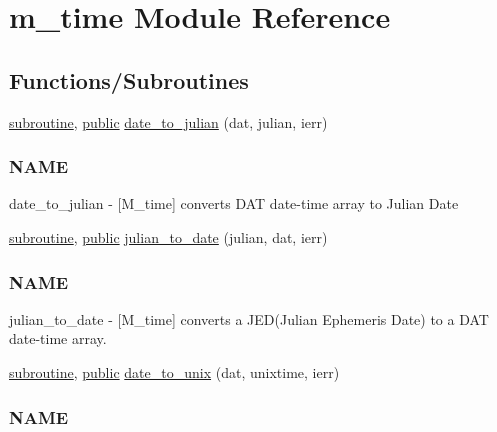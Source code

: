 \hypertarget{namespacem__time}{}\section{m\+\_\+time Module Reference}
\label{namespacem__time}
\subsection*{Functions/\+Subroutines}
\begin{DoxyCompactItemize}
\item 
\hyperlink{M__stopwatch_83_8txt_acfbcff50169d691ff02d4a123ed70482}{subroutine}, \hyperlink{M__stopwatch_83_8txt_a2f74811300c361e53b430611a7d1769f}{public} \hyperlink{namespacem__time_acfdc970b4154b0c15bd33727636e3992}{date\+\_\+to\+\_\+julian} (dat, julian, ierr)
\begin{DoxyCompactList}\small\item\em \subsubsection*{N\+A\+ME}

date\+\_\+to\+\_\+julian -\/ \mbox{[}M\+\_\+time\mbox{]} converts D\+AT date-\/time array to Julian Date \end{DoxyCompactList}\item 
\hyperlink{M__stopwatch_83_8txt_acfbcff50169d691ff02d4a123ed70482}{subroutine}, \hyperlink{M__stopwatch_83_8txt_a2f74811300c361e53b430611a7d1769f}{public} \hyperlink{namespacem__time_abb44cf18cd0a3e420c20469efb056203}{julian\+\_\+to\+\_\+date} (julian, dat, ierr)
\begin{DoxyCompactList}\small\item\em \subsubsection*{N\+A\+ME}

julian\+\_\+to\+\_\+date -\/ \mbox{[}M\+\_\+time\mbox{]} converts a J\+E\+D(\+Julian Ephemeris Date) to a D\+AT date-\/time array. \end{DoxyCompactList}\item 
\hyperlink{M__stopwatch_83_8txt_acfbcff50169d691ff02d4a123ed70482}{subroutine}, \hyperlink{M__stopwatch_83_8txt_a2f74811300c361e53b430611a7d1769f}{public} \hyperlink{namespacem__time_aed245c691853279ebf0ce899dec9caa9}{date\+\_\+to\+\_\+unix} (dat, unixtime, ierr)
\begin{DoxyCompactList}\small\item\em \subsubsection*{N\+A\+ME}


\end{DoxyCompactList}
\end{DoxyCompactItemize}
